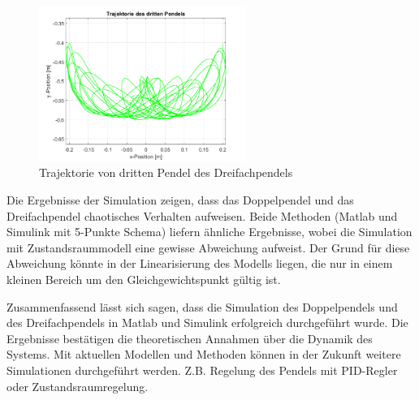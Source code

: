 \begin{figure}[H]
    \centering
    \includegraphics[width=0.6\textwidth]{figures/Dreifachpendel_Ergebniss_Trajektorie.png}
    \caption{Trajektorie von dritten Pendel des Dreifachpendels}
    \label{fig:Dreifachpendel_Ergebniss_Trajektorie}
\end{figure}

Die Ergebnisse der Simulation zeigen, dass das Doppelpendel und das Dreifachpendel chaotisches Verhalten aufweisen. Beide Methoden (Matlab und Simulink mit 5-Punkte Schema) liefern ähnliche Ergebnisse, wobei die Simulation mit Zustandsraummodell eine gewisse Abweichung aufweist. Der Grund für diese Abweichung könnte in der Linearisierung des Modells liegen, die nur in einem kleinen Bereich um den Gleichgewichtspunkt gültig ist. 

Zusammenfassend lässt sich sagen, dass die Simulation des Doppelpendels und des Dreifachpendels in Matlab und Simulink erfolgreich durchgeführt wurde. Die Ergebnisse bestätigen die theoretischen Annahmen über die Dynamik des Systems. Mit aktuellen Modellen und Methoden können in der Zukunft weitere Simulationen durchgeführt werden. Z.B. Regelung des Pendels mit PID-Regler oder Zustandsraumregelung. 